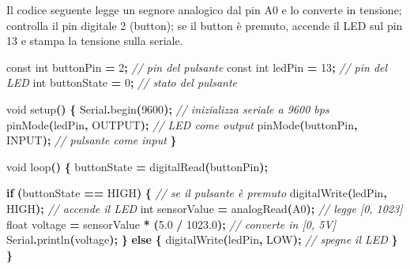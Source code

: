 \documentclass[
  italian,
  openany]{book}
\newenvironment{Shaded}{\begin{snugshade}}{\end{snugshade}}
\newcommand{\AttributeTok}[1]{\textcolor[rgb]{0.13,0.29,0.53}{#1}}
\newcommand{\CommentTok}[1]{\textcolor[rgb]{0.56,0.35,0.01}{\textit{#1}}}
\newcommand{\ControlFlowTok}[1]{\textcolor[rgb]{0.13,0.29,0.53}{\textbf{#1}}}
\newcommand{\DataTypeTok}[1]{\textcolor[rgb]{0.13,0.29,0.53}{#1}}
\newcommand{\DecValTok}[1]{\textcolor[rgb]{0.00,0.00,0.81}{#1}}
\newcommand{\FloatTok}[1]{\textcolor[rgb]{0.00,0.00,0.81}{#1}}
\newcommand{\NormalTok}[1]{#1}
\newcommand{\OperatorTok}[1]{\textcolor[rgb]{0.81,0.36,0.00}{\textbf{#1}}}
\begin{document}
Il codice seguente legge un segnore analogico dal pin A0 e lo converte
in tensione; controlla il pin digitale 2 (button); se il button è
premuto, accende il LED sul pin 13 e stampa la tensione sulla seriale.

\begin{Shaded}
\begin{Highlighting}[]
\AttributeTok{const} \DataTypeTok{int}\NormalTok{ buttonPin }\OperatorTok{=} \DecValTok{2}\OperatorTok{;}   \CommentTok{// pin del pulsante}
\AttributeTok{const} \DataTypeTok{int}\NormalTok{ ledPin }\OperatorTok{=} \DecValTok{13}\OperatorTok{;}     \CommentTok{// pin del LED}
\DataTypeTok{int}\NormalTok{ buttonState }\OperatorTok{=} \DecValTok{0}\OperatorTok{;}       \CommentTok{// stato del pulsante}

\DataTypeTok{void}\NormalTok{ setup}\OperatorTok{()} \OperatorTok{\{}
\NormalTok{  Serial}\OperatorTok{.}\NormalTok{begin}\OperatorTok{(}\DecValTok{9600}\OperatorTok{);}           \CommentTok{// inizializza seriale a 9600 bps}
\NormalTok{  pinMode}\OperatorTok{(}\NormalTok{ledPin}\OperatorTok{,}\NormalTok{ OUTPUT}\OperatorTok{);}      \CommentTok{// LED come output}
\NormalTok{  pinMode}\OperatorTok{(}\NormalTok{buttonPin}\OperatorTok{,}\NormalTok{ INPUT}\OperatorTok{);}    \CommentTok{// pulsante come input}
\OperatorTok{\}}

\DataTypeTok{void}\NormalTok{ loop}\OperatorTok{()} \OperatorTok{\{}
\NormalTok{  buttonState }\OperatorTok{=}\NormalTok{ digitalRead}\OperatorTok{(}\NormalTok{buttonPin}\OperatorTok{);}

  \ControlFlowTok{if} \OperatorTok{(}\NormalTok{buttonState }\OperatorTok{==}\NormalTok{ HIGH}\OperatorTok{)} \OperatorTok{\{}        \CommentTok{// se il pulsante è premuto}
\NormalTok{    digitalWrite}\OperatorTok{(}\NormalTok{ledPin}\OperatorTok{,}\NormalTok{ HIGH}\OperatorTok{);}      \CommentTok{// accende il LED}
    \DataTypeTok{int}\NormalTok{ sensorValue }\OperatorTok{=}\NormalTok{ analogRead}\OperatorTok{(}\NormalTok{A0}\OperatorTok{);}            \CommentTok{// legge [0, 1023]}
    \DataTypeTok{float}\NormalTok{ voltage }\OperatorTok{=}\NormalTok{ sensorValue }\OperatorTok{*} \OperatorTok{(}\FloatTok{5.0} \OperatorTok{/} \FloatTok{1023.0}\OperatorTok{);} \CommentTok{// converte in [0, 5V]}
\NormalTok{    Serial}\OperatorTok{.}\NormalTok{println}\OperatorTok{(}\NormalTok{voltage}\OperatorTok{);}
  \OperatorTok{\}} \ControlFlowTok{else} \OperatorTok{\{}
\NormalTok{    digitalWrite}\OperatorTok{(}\NormalTok{ledPin}\OperatorTok{,}\NormalTok{ LOW}\OperatorTok{);}       \CommentTok{// spegne il LED}
  \OperatorTok{\}}
\OperatorTok{\}}
\end{Highlighting}
\end{Shaded}
\end{document}
